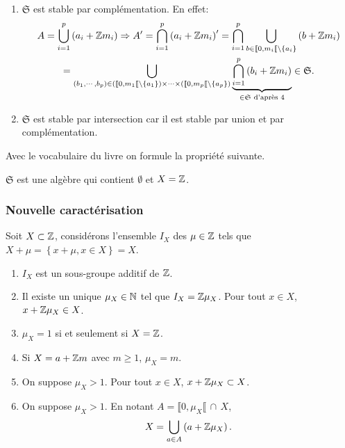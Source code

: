 \begin{rems}
\begin{enumerate}
  \item $\mathfrak{S}$ est stable par complémentation. En effet:
\begin{multline*}
  A = \bigcup_{i=1}^{p}\left(a_i + \mathbb{Z} m_i\right) \Rightarrow A' = \bigcap_{i=1}^{p}\left(a_i + \mathbb{Z} m_i\right)'
  = \bigcap_{i=1}^{p} \bigcup_{b \in \llbracket 0, m_i\llbracket \setminus\{a_i\}}\left(b + \mathbb{Z} m_i\right)\\
  = \bigcup_{(b_1,\cdots,b_p) \in \left(\llbracket 0, m_1\llbracket \setminus\{a_1\}\right) \times \cdots \times \left(\llbracket 0, m_p\llbracket \setminus\{a_p\}\right)} \underbrace{\bigcap_{i=1}^p \left( b_i + \mathbb{Z} m_i\right)}_{\in \mathfrak{S} \text{ d'après 4}} \in \mathfrak{S} .
\end{multline*}

  \item $\mathfrak{S}$ est stable par intersection car il est stable par union et par complémentation.
  
\end{enumerate}
\end{rems}

Avec le vocabulaire du livre on formule la propriété suivante.
\begin{prop}
  $\mathfrak{S}$ est une algèbre qui contient $\emptyset$ et $X=\mathbb{Z}$.
\end{prop}

\subsubsection{Nouvelle caractérisation}
Soit $X \subset \mathbb{Z}$, considérons l'ensemble $I_X$ des $\mu \in \mathbb{Z}$ tels que $X + \mu =\left\lbrace x + \mu , x\in X\right\rbrace = X$.
\begin{rems}
  \begin{enumerate}
    \item $I_X$ est un sous-groupe additif de $\mathbb{Z}$.
    \item Il existe un unique $\mu_X \in \mathbb{N}$ tel que $I_X = \mathbb{Z} \mu_X$. Pour tout $x\in X$, $x + \mathbb{Z} \mu_X \in X$.
    \item $\mu_X = 1$ si et seulement si $X=\mathbb{Z}$.
    \item Si $X = a + \mathbb{Z} m$ avec $m \geq 1$, $\mu_X = m$.
    \item On suppose $\mu_X > 1$. Pour tout $x \in X$, $x + \mathbb{Z} \mu_X \subset X$.
    \item On suppose $\mu_X > 1$. En notant $A  = \llbracket 0 , \mu_X \llbracket \, \cap \, X$, 
\begin{displaymath}
  X = \bigcup_{a \in A}\left(a + \mathbb{Z} \mu_X\right).
\end{displaymath}
  \end{enumerate}
\end{rems}

